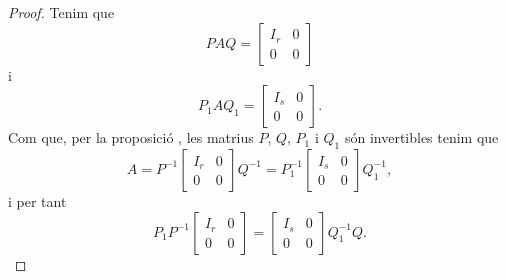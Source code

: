 \documentclass[../../Main.tex]{subfiles}
\begin{document}
\begin{theorem}
\begin{proof}
			Tenim que
			\[PAQ=\left[\begin{array}{c|c}
			I_{r} & 0\\\hline
			0 & 0
			\end{array}\right]\]
			i
			\[P_{1}AQ_{1}=\left[\begin{array}{c|c}
			I_{s} & 0\\\hline
			0 & 0
			\end{array}\right].\]
			Com que, per la proposició , les matrius \(P\), \(Q\), \(P_{1}\) i \(Q_{1}\) són invertibles tenim que
			\[A=P^{-1}\left[\begin{array}{c|c}
			I_{r} & 0\\\hline
			0 & 0
			\end{array}\right]Q^{-1}=P_{1}^{-1}\left[\begin{array}{c|c}
			I_{s} & 0\\\hline
			0 & 0
			\end{array}\right]Q_{1}^{-1},\]
			i per tant
			\[P_{1}P^{-1}\left[\begin{array}{c|c}
			I_{r} & 0\\\hline
			0 & 0
			\end{array}\right]=
			\left[\begin{array}{c|c}
			I_{s} & 0\\\hline
			0 & 0
			\end{array}\right]Q_{1}^{-1}Q.\]
			

\end{proof}
\end{theorem}
\end{document}
